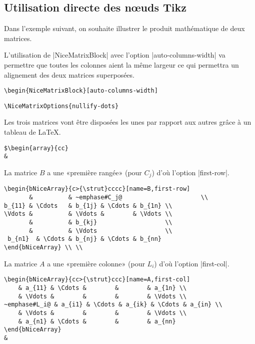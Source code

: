 \documentclass[dvipsnames]{article}%
\begin{document}
\subsection{Utilisation directe des nœuds Tikz}

Dans l'exemple suivant, on souhaite illustrer le produit mathématique de deux matrices.

\medskip
L'utilisation de |{NiceMatrixBlock}| avec l'option |auto-columns-width| va
permettre que toutes les colonnes aient la même largeur ce qui permettra un
alignement des deux matrices superposées.
\begin{Verbatim}
\begin{NiceMatrixBlock}[auto-columns-width]
\end{Verbatim}

\begin{Verbatim}
\NiceMatrixOptions{nullify-dots}
\end{Verbatim}

Les trois matrices vont être disposées les unes par rapport aux autres grâce à un tableau de LaTeX.
\begin{Verbatim}
$\begin{array}{cc}
& 
\end{Verbatim}

La matrice $B$ a une «première rangée» (pour $C_j$) d'où l'option |first-row|.
\begin{Verbatim}
\begin{bNiceArray}{c>{\strut}cccc}[name=B,first-row]
       &          & ~emphase#C_j@                      \\
b_{11} & \Cdots   & b_{1j} & \Cdots & b_{1n} \\
\Vdots &          & \Vdots &        & \Vdots \\
       &          & b_{kj}                   \\
       &          & \Vdots                   \\
 b_{n1}  & \Cdots & b_{nj} & \Cdots & b_{nn} 
\end{bNiceArray} \\ \\
\end{Verbatim}

La matrice $A$ a une «première colonne» (pour $L_i$) d'où l'option |first-col|.
\begin{Verbatim}
\begin{bNiceArray}{cc>{\strut}ccc}[name=A,first-col]
    & a_{11} & \Cdots &        &        & a_{1n} \\
    & \Vdots &        &        &        & \Vdots \\
~emphase#L_i@ & a_{i1} & \Cdots & a_{ik} & \Cdots & a_{in} \\
    & \Vdots &        &        &        & \Vdots \\
    & a_{n1} & \Cdots &        &        & a_{nn} 
\end{bNiceArray}
& 
\end{Verbatim}
\end{document}
